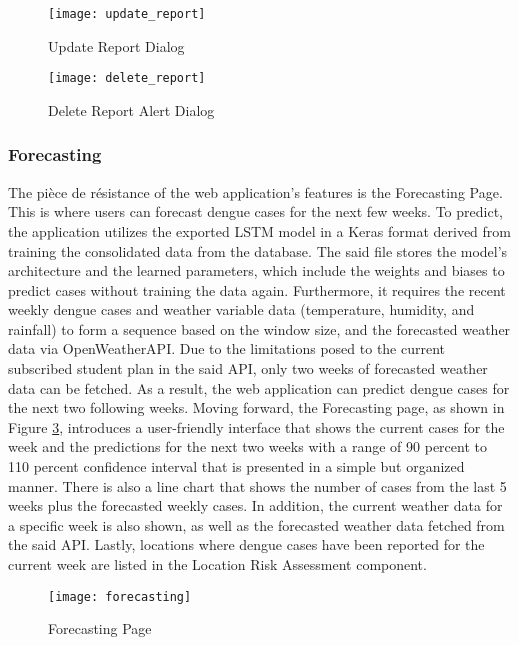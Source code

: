 \begin{figure}[H]
	\centering
	\texttt{[image: update\_report]}
	\caption{Update Report Dialog}
	\label{fig:update_report}
\end{figure}
\begin{figure}[H]
	\centering
	\texttt{[image: delete\_report]}
	\caption{Delete Report Alert Dialog}
	\label{fig:delete_report}
\end{figure}

\subsubsection{Forecasting}

The pièce de résistance of the web application's features is the Forecasting Page. This is where users can forecast dengue cases for the next few weeks. To predict, the application utilizes the exported LSTM model in a Keras format derived from training the consolidated data from the database. The said file stores the model's architecture and the learned parameters, which include the weights and biases to predict cases without training the data again.  Furthermore, it requires the recent weekly dengue cases and weather variable data (temperature, humidity, and rainfall) to form a sequence based on the window size, and the forecasted weather data via OpenWeatherAPI. Due to the limitations posed to the current subscribed student plan in the said API, only two weeks of forecasted weather data can be fetched. As a result, the web application can predict dengue cases for the next two following weeks. Moving forward, the Forecasting page, as shown in Figure \ref{fig:forecasting}, introduces a user-friendly interface that shows the current cases for the week and the predictions for the next two weeks with a range of 90 percent to 110 percent confidence interval that is presented in a simple but organized manner. There is also a line chart that shows the number of cases from the last 5 weeks plus the forecasted weekly cases. In addition, the current weather data for a specific week is also shown, as well as the forecasted weather data fetched from the said API. Lastly, locations where dengue cases have been reported for the current week are listed in the Location Risk Assessment component. 

\begin{figure}[H]
	\centering
	\texttt{[image: forecasting]}
	\caption{Forecasting Page}
	\label{fig:forecasting}
\end{figure}

